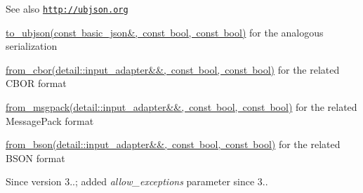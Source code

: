 \begin{DoxySeeAlso}{See also}
\href{http://ubjson.org}{\tt http\+://ubjson.\+org} 

\mbox{\hyperlink{classnlohmann_1_1basic__json_ae1ece6c2059114eac10873f13ef19185}{to\+\_\+ubjson(const basic\+\_\+json\&, const bool, const bool)}} for the analogous serialization 

\mbox{\hyperlink{classnlohmann_1_1basic__json_a1d568ba1bd6978d80db42aa76626e2cf}{from\+\_\+cbor(detail\+::input\+\_\+adapter\&\&, const bool, const bool)}} for the related C\+B\+OR format 

\mbox{\hyperlink{classnlohmann_1_1basic__json_a11458b7982adba51bc634f2f8c961e9b}{from\+\_\+msgpack(detail\+::input\+\_\+adapter\&\&, const bool, const bool)}} for the related Message\+Pack format 

\mbox{\hyperlink{classnlohmann_1_1basic__json_a0524486cd0b36a47448df882ec0d5e7b}{from\+\_\+bson(detail\+::input\+\_\+adapter\&\&, const bool, const bool)}} for the related B\+S\+ON format
\end{DoxySeeAlso}
\begin{DoxySince}{Since}
version 3..; added {\itshape allow\+\_\+exceptions} parameter since 3.. 
\end{DoxySince}
\mbox{\label{classnlohmann_1_1basic__json_a46afafed69ed4c8ae797afb8445fd42f}} 
